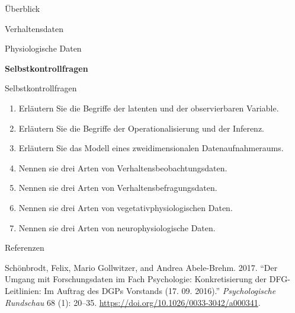 \documentclass[
  8pt,
  ignorenonframetext,
]{beamer}
\providecommand{\tightlist}{%
  \setlength{\itemsep}{0pt}\setlength{\parskip}{0pt}}
\newlength{\cslhangindent}
\newlength{\cslentryspacingunit} %
\newenvironment{CSLReferences}[2] %
 {%
  \setlength{\parindent}{0pt}
  \ifodd #1
  \let\oldpar\par
  \def\par{\hangindent=\cslhangindent\oldpar}
  \fi
  \setlength{\parskip}{#2\cslentryspacingunit}
 }%
 {}
\begin{document}
\begin{frame}{}
\protect\hypertarget{section-5}{}
\Large
{}
\vfill

Überblick

Verhaltensdaten

Physiologische Daten

\textbf{Selbstkontrollfragen} \vfill
\end{frame}

\begin{frame}{Selbstkontrollfragen}
\protect\hypertarget{selbstkontrollfragen}{}
\small
{}

\begin{enumerate}
\tightlist
\item
  Erläutern Sie die Begriffe der latenten und der observierbaren
  Variable.
\item
  Erläutern Sie die Begriffe der Operationalisierung und der Inferenz.
\item
  Erläutern Sie das Modell eines zweidimensionalen Datenaufnahmeraums.
\item
  Nennen sie drei Arten von Verhaltensbeobachtungsdaten.
\item
  Nennen sie drei Arten von Verhaltensbefragungsdaten.
\item
  Nennen sie drei Arten von vegetativphysiologischen Daten.
\item
  Nennen sie drei Arten von neurophysiologische Daten.
\end{enumerate}
\end{frame}

\begin{frame}{Referenzen}
\protect\hypertarget{referenzen}{}
\footnotesize

\hypertarget{refs}{}
\begin{CSLReferences}{1}{0}
\leavevmode{}%
Schönbrodt, Felix, Mario Gollwitzer, and Andrea Abele-Brehm. 2017.
{``{Der Umgang mit Forschungsdaten im Fach Psychologie: Konkretisierung
der DFG-Leitlinien: Im Auftrag des DGPs Vorstands (17. 09. 2016)}.''}
\emph{Psychologische Rundschau} 68 (1): 20--35.
\url{https://doi.org/10.1026/0033-3042/a000341}.

\end{CSLReferences}
\end{frame}
\end{document}
